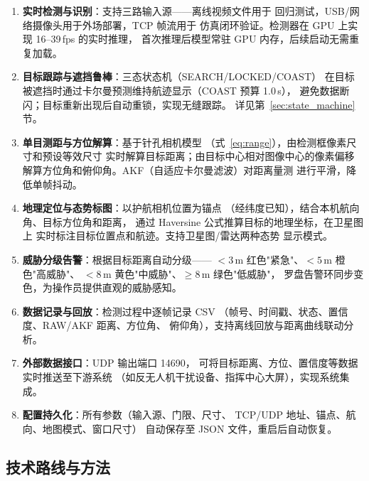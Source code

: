 \documentclass[12pt, a4paper]{ctexart}
\begin{document}
\begin{enumerate}
  \item \textbf{实时检测与识别}：支持三路输入源——离线视频文件用于
        回归测试，USB/网络摄像头用于外场部署，TCP 帧流用于
        仿真闭环验证。检测器在 GPU 上实现 16--39\,fps 的实时推理，
        首次推理后模型常驻 GPU 内存，后续启动无需重复加载。

  \item \textbf{目标跟踪与遮挡鲁棒}：三态状态机（SEARCH/LOCKED/COAST）
        在目标被遮挡时通过卡尔曼预测维持航迹显示（COAST 预算 1.0\,s），
        避免数据断闪；目标重新出现后自动重锁，实现无缝跟踪。
        详见第~\ref{sec:state_machine} 节。

  \item \textbf{单目测距与方位解算}：基于针孔相机模型
        （式~\ref{eq:range}），由检测框像素尺寸和预设等效尺寸
        实时解算目标距离；由目标中心相对图像中心的像素偏移
        解算方位角和俯仰角。AKF（自适应卡尔曼滤波）对距离量测
        进行平滑，降低单帧抖动。

  \item \textbf{地理定位与态势标图}：以护航相机位置为锚点
        （经纬度已知），结合本机航向角、目标方位角和距离，
        通过 Haversine 公式推算目标的地理坐标，在卫星图上
        实时标注目标位置点和航迹。支持卫星图/雷达两种态势
        显示模式。

  \item \textbf{威胁分级告警}：根据目标距离自动分级——
        $< 3$\,m 红色"紧急"、$< 5$\,m 橙色"高威胁"、
        $< 8$\,m 黄色"中威胁"、$\geq 8$\,m 绿色"低威胁"，
        罗盘告警环同步变色，为操作员提供直观的威胁感知。

  \item \textbf{数据记录与回放}：检测过程中逐帧记录 CSV
        （帧号、时间戳、状态、置信度、RAW/AKF 距离、方位角、
        俯仰角），支持离线回放与距离曲线联动分析。

  \item \textbf{外部数据接口}：UDP 输出端口 14690，
        可将目标距离、方位、置信度等数据实时推送至下游系统
        （如反无人机干扰设备、指挥中心大屏），实现系统集成。

  \item \textbf{配置持久化}：所有参数（输入源、门限、尺寸、
        TCP/UDP 地址、锚点、航向、地图模式、窗口尺寸）
        自动保存至 JSON 文件，重启后自动恢复。
\end{enumerate}

\subsection{技术路线与方法}
\end{document}
